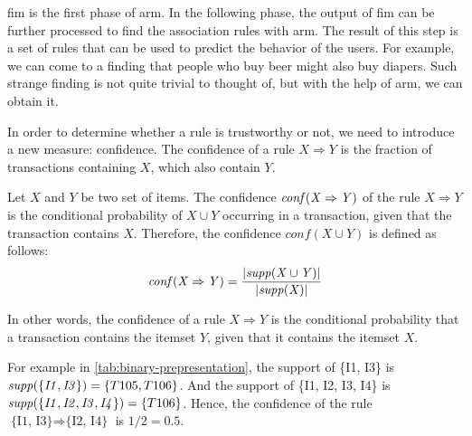 \Ac{fim} is the first phase of \ac{arm}.
In the following phase, the output of \ac{fim} can be further processed to find the association rules with \acl{arm}.
The result of this step is a set of rules that can be used to predict the behavior of the users.
For example, we can come to a finding that people who buy beer might also buy diapers.
Such strange finding is not quite trivial to thought of, but with the help of \acl{arm}, we can obtain it.

In order to determine whether a rule is trustworthy or not, we need to introduce a new measure: confidence.
The confidence of a rule $X \Rightarrow Y$ is the fraction of transactions containing $X$, which also contain $Y$.
\begin{definition}
    Let $X$ and $Y$ be two set of items.
    The confidence $\mathit{conf({X} \Rightarrow {Y})}$ of the rule $X \Rightarrow Y$ is the conditional probability of $X \cup Y$ occurring in a transaction, given that the transaction contains $X$.
    Therefore, the confidence $\mathit{conf}(X \cup Y)$ is defined as follows:
    \begin{equation}
        \mathit{conf({X} \Rightarrow {Y})} = \frac{\lvert \mathit{supp({X \cup Y})} \rvert}{\lvert \mathit{supp({X})} \rvert}
    \end{equation}
\end{definition}
In other words, the confidence of a rule $X \Rightarrow Y$ is the conditional probability that a transaction contains the itemset $Y$, given that it contains the itemset $X$.

For example in \autoref{tab:binary-prepresentation}, the support of \{I1, I3\} is $\mathit{supp({\{I1, I3\}})} = \{T105, T106\}$.
And the support of \{I1, I2, I3, I4\} is $\mathit{supp({\{I1, I2, I3, I4\}})} = \{T106\}$.
Hence, the confidence of the rule $\text{\{I1, I3\}} \Rightarrow \text{\{I2, I4\}}$ is $1 / 2 = 0.5$.

